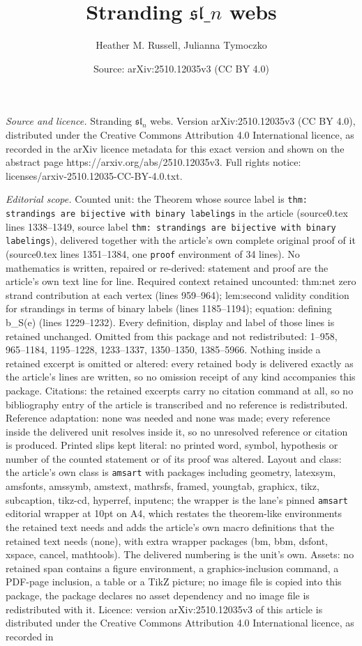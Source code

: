 \documentclass[10pt,a4paper]{amsart}
\title[Stranding $\mathfrak{sl}\_n$ webs]{Stranding $\mathfrak{sl}\_n$ webs}
\author{Heather M. Russell, Julianna Tymoczko}
\date{Source: arXiv:2510.12035v3 (CC BY 4.0)}
\begin{document}
\maketitle

\noindent\emph{Source and licence.} Stranding $\mathfrak{sl}_n$ webs. Version arXiv:2510.12035v3 (CC BY 4.0), distributed under the Creative Commons Attribution 4.0 International licence, as recorded in the arXiv licence metadata for this exact version and shown on the abstract page https://arxiv.org/abs/2510.12035v3. Full rights notice: licenses/arxiv-2510.12035-CC-BY-4.0.txt.\par\smallskip

\noindent\textit{Editorial scope.} Counted unit: the Theorem whose source label is \texttt{thm: strandings are bijective with binary labelings} in the article (source0.tex lines 1338--1349, source label \texttt{thm: strandings are bijective with binary labelings}), delivered together with the article's own complete original proof of it (source0.tex lines 1351--1384, one \texttt{proof} environment of 34 lines). No mathematics is written, repaired or re-derived: statement and proof are the article's own text line for line. Required context retained uncounted: thm:net zero strand contribution at each vertex (lines 959--964); lem:second validity condition for strandings in terms of binary labels (lines 1185--1194); equation: defining b\_S(e) (lines 1229--1232). Every definition, display and label of those lines is retained unchanged. Omitted from this package and not redistributed: 1--958, 965--1184, 1195--1228, 1233--1337, 1350--1350, 1385--5966. Nothing inside a retained excerpt is omitted or altered: every retained body is delivered exactly as the article's lines are written, so no omission receipt of any kind accompanies this package. Citations: the retained excerpts carry no citation command at all, so no bibliography entry of the article is transcribed and no reference is redistributed. Reference adaptation: none was needed and none was made; every reference inside the delivered unit resolves inside it, so no unresolved reference or citation is produced. Printed slips kept literal: no printed word, symbol, hypothesis or number of the counted statement or of its proof was altered. Layout and class: the article's own class is \texttt{amsart} with packages including geometry, latexsym, amsfonts, amssymb, amstext, mathrsfs, framed, youngtab, graphicx, tikz, subcaption, tikz-cd, hyperref, inputenc; the wrapper is the lane's pinned \texttt{amsart} editorial wrapper at 10pt on A4, which restates the theorem-like environments the retained text needs and adds the article's own macro definitions that the retained text needs (none), with extra wrapper packages (bm, bbm, dsfont, xspace, cancel, mathtools). The delivered numbering is the unit's own. Assets: no retained span contains a figure environment, a graphics-inclusion command, a PDF-page inclusion, a table or a TikZ picture; no image file is copied into this package, the package declares no asset dependency and no image file is redistributed with it. Licence: version arXiv:2510.12035v3 of this article is distributed under the Creative Commons Attribution 4.0 International licence, as recorded in 
\end{document}
